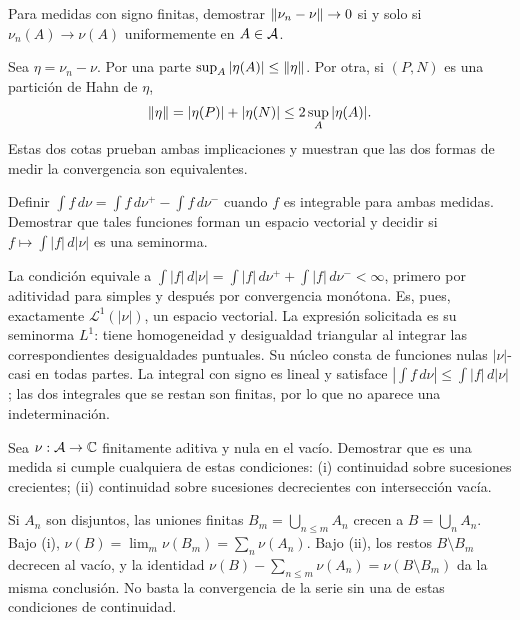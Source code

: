 \begin{ejercicio}\label{ej:v2-l25-5}
Para medidas con signo finitas, demostrar $\left\lVert\nu_n-\nu\right\rVert\to0$ si y solo si $\nu_n(A)\to\nu(A)$ uniformemente en $A\in\mathcal A$.
\end{ejercicio}
\begin{solucion}
Sea $\eta=\nu_n-\nu$. Por una parte $\sup_A|\eta(A)|\le\left\lVert\eta\right\rVert$. Por otra, si $(P,N)$ es una partición de Hahn de $\eta$,
\[
 \left\lVert\eta\right\rVert=|\eta(P)|+|\eta(N)|\le2\sup_A|\eta(A)|.
\]
Estas dos cotas prueban ambas implicaciones y muestran que las dos formas de medir la convergencia son equivalentes.
\end{solucion}

\begin{ejercicio}\label{ej:v2-l25-6}
Definir $\int f\,d\nu=\int f\,d\nu^+-\int f\,d\nu^-$ cuando $f$ es integrable para ambas medidas. Demostrar que tales funciones forman un espacio vectorial y decidir si $f\mapsto\int|f|\,d|\nu|$ es una seminorma.
\end{ejercicio}
\begin{solucion}
La condición equivale a $\int|f|\,d|\nu|=\int|f|\,d\nu^++\int|f|\,d\nu^-<\infty$, primero por aditividad para simples y después por convergencia monótona. Es, pues, exactamente $\mathcal L^1(|\nu|)$, un espacio vectorial. La expresión solicitada es su seminorma $L^1$: tiene homogeneidad y desigualdad triangular al integrar las correspondientes desigualdades puntuales. Su núcleo consta de funciones nulas $|\nu|$-casi en todas partes. La integral con signo es lineal y satisface $|\int f\,d\nu|\le\int|f|\,d|\nu|$; las dos integrales que se restan son finitas, por lo que no aparece una indeterminación.
\end{solucion}

\begin{ejercicio}\label{ej:v2-l26-1}
Sea $\nu:\mathcal A\to\mathbb C$ finitamente aditiva y nula en el vacío. Demostrar que es una medida si cumple cualquiera de estas condiciones: (i) continuidad sobre sucesiones crecientes; (ii) continuidad sobre sucesiones decrecientes con intersección vacía.
\end{ejercicio}
\begin{solucion}
Si $A_n$ son disjuntos, las uniones finitas $B_m=\bigcup_{n\le m}A_n$ crecen a $B=\bigcup_nA_n$. Bajo (i), $\nu(B)=\lim_m\nu(B_m)=\sum_n\nu(A_n)$. Bajo (ii), los restos $B\setminus B_m$ decrecen al vacío, y la identidad $\nu(B)-\sum_{n\le m}\nu(A_n)=\nu(B\setminus B_m)$ da la misma conclusión. No basta la convergencia de la serie sin una de estas condiciones de continuidad.
\end{solucion}

